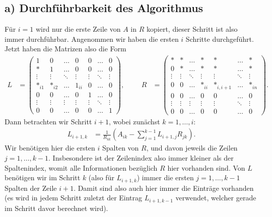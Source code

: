 \documentclass[english, parskip=full]{scrartcl}
\newcommand{\kla}{}
\begin{document}
\subsection*{a) Durchführbarkeit des Algorithmus}
Für $i=1$ wird nur die erste Zeile von $A$ in $R$ kopiert, dieser Schritt ist also immer durchführbar.
Angenommen wir haben die ersten $i$ Schritte durchgeführt.
Jetzt haben die Matrizen also die Form
\begin{align}
L &= \begin{pmatrix}
1 & 0 & \dots & 0 & 0 & \dots & 0 \\
\ast & 1 & \dots & 0 & 0 & \dots & 0 \\
\vdots & \vdots & \ddots & \vdots & \vdots & \ddots & \vdots \\
\ast_{i1} & \ast_{i2} & \dots & 1_{ii} & 0 & \dots & 0 \\
0 & 0 & \dots & 0 & 1 & \dots & 0 \\
\vdots & \vdots & \vdots & \vdots & \vdots & \ddots & \vdots \\
0 & 0 & \dots & 0 & 0 & \dots & 1
\end{pmatrix}, && & R &= \begin{pmatrix}
\ast & \ast & \dots & \ast & \ast & \dots & \ast \\
0 & \ast & \dots & \ast & \ast & \dots & \ast \\
\vdots & \vdots & \ddots & \vdots & \vdots & \ddots & \vdots \\
0 & 0 & \dots & \ast_{ii} & \ast_{i,i+1} & \dots & \ast_{in} \\
0 & 0 & \dots & 0 & 0 & \dots & 0 \\
\vdots & \vdots & \vdots & \vdots & \vdots & \ddots & \vdots \\
0 & 0 & \dots & 0 & 0 & \dots & 0
\end{pmatrix}.
\end{align}
Dann betrachten wir Schritt $i+1$, wobei zunächst $k=1,\dots,i$:
\begin{align}
L_{i+1,k} &= \frac{1}{R_{kk}} \kla\left( A_{ik} - \sum_{j=1}^{k-1} L_{i+1,j}R_{jk} \right).
\end{align}
Wir benötigen hier die ersten $i$ Spalten von $R$, und davon jeweils die Zeilen $j=1,\dots,k-1$.
Insbesondere ist der Zeilenindex also immer kleiner als der Spaltenindex, womit alle Informationen bezüglich $R$ hier vorhanden sind.
Von $L$ benötigen wir im Schritt $k$ (also für $L_{i+1,k}$) immer die ersten $j=1,\dots,k-1$ Spalten der Zeile $i+1$.
Damit sind also auch hier immer die Einträge vorhanden (es wird in jedem Schritt zuletzt der Eintrag $L_{i+1,k-1}$ verwendet, welcher gerade im Schritt davor berechnet wird).
\end{document}
